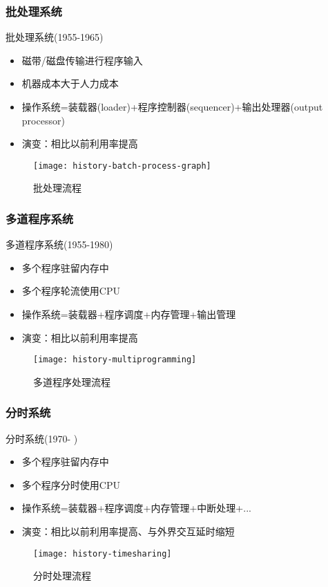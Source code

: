 \begin{frame}
	
	\frametitle{批处理系统}
	
	批处理系统(1955-1965)
	\begin{itemize}
		\item 磁带/磁盘传输进行程序输入
		\item 机器成本大于人力成本	
		\item 操作系统=装载器(loader)+程序控制器(sequencer)+输出处理器(output processor)
		\item 演变：相比以前利用率提高
	\end{itemize}
	
	\begin{figure}
		\centering
		\texttt{[image: history-batch-process-graph]}
		\caption{批处理流程}
	\end{figure}
	
\end{frame}




\begin{frame}[plain]
	
	\frametitle{多道程序系统}
	
	多道程序系统(1955-1980)
	\begin{itemize}
		\item 多个程序驻留内存中
		\item 多个程序轮流使用CPU	
		\item 操作系统=装载器+程序调度+内存管理+输出管理
		\item 演变：相比以前利用率提高
	\end{itemize}
	
	\begin{figure}
		\centering
		\texttt{[image: history-multiprogramming]}
		\caption{多道程序处理流程}
	\end{figure}
	
\end{frame}


\begin{frame}[plain]
	
	\frametitle{分时系统}
	
	分时系统(1970- )
	\begin{itemize}
		\item 多个程序驻留内存中
		\item 多个程序分时使用CPU	
		\item 操作系统=装载器+程序调度+内存管理+中断处理+...
		\item 演变：相比以前利用率提高、与外界交互延时缩短
	\end{itemize}
	
	\begin{figure}
		\centering
		\texttt{[image: history-timesharing]}
		\caption{分时处理流程}
	\end{figure}
	
\end{frame}


